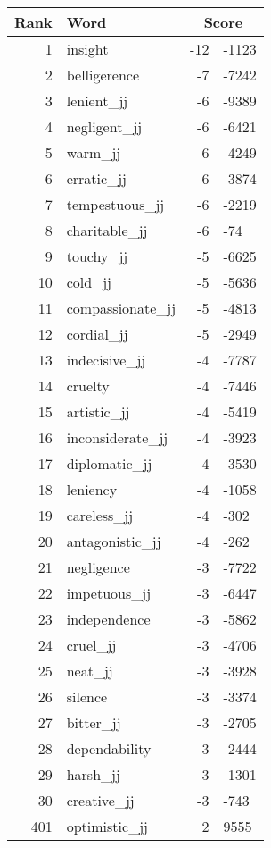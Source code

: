 \begin{longtable}[!htbp]{| rlr@{.}l |}
    \hline
    \textbf{Rank} & \textbf{Word} & \multicolumn{2}{c|}{\textbf{Score}} \\
    \hline
    \endhead
    1 & insight & -12 & -1123 \\
    2 & belligerence & -7 & -7242 \\
    3 & lenient\_jj & -6 & -9389 \\
    4 & negligent\_jj & -6 & -6421 \\
    5 & warm\_jj & -6 & -4249 \\
    6 & erratic\_jj & -6 & -3874 \\
    7 & tempestuous\_jj & -6 & -2219 \\
    8 & charitable\_jj & -6 & -74 \\
    9 & touchy\_jj & -5 & -6625 \\
    10 & cold\_jj & -5 & -5636 \\
    11 & compassionate\_jj & -5 & -4813 \\
    12 & cordial\_jj & -5 & -2949 \\
    13 & indecisive\_jj & -4 & -7787 \\
    14 & cruelty & -4 & -7446 \\
    15 & artistic\_jj & -4 & -5419 \\
    16 & inconsiderate\_jj & -4 & -3923 \\
    17 & diplomatic\_jj & -4 & -3530 \\
    18 & leniency & -4 & -1058 \\
    19 & careless\_jj & -4 & -302 \\
    20 & antagonistic\_jj & -4 & -262 \\
    21 & negligence & -3 & -7722 \\
    22 & impetuous\_jj & -3 & -6447 \\
    23 & independence & -3 & -5862 \\
    24 & cruel\_jj & -3 & -4706 \\
    25 & neat\_jj & -3 & -3928 \\
    26 & silence & -3 & -3374 \\
    27 & bitter\_jj & -3 & -2705 \\
    28 & dependability & -3 & -2444 \\
    29 & harsh\_jj & -3 & -1301 \\
    30 & creative\_jj & -3 & -743 \\
    401 & optimistic\_jj & 2 & 9555 \\

\end{longtable}
